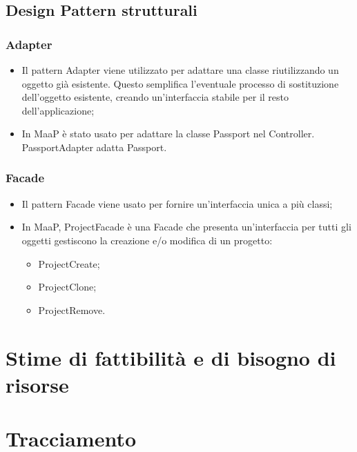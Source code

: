 \subsection{Design Pattern strutturali}
\subsubsection{Adapter}
\begin{itemize}
\item {} Il pattern Adapter viene utilizzato per adattare una classe riutilizzando un oggetto già esistente. Questo semplifica l'eventuale processo di sostituzione dell'oggetto esistente, creando un'interfaccia stabile per il resto dell'applicazione; 
\item {} In MaaP è stato usato per adattare la classe Passport nel Controller. PassportAdapter adatta Passport.
\end{itemize}

\subsubsection{Facade}
\begin{itemize}
\item {} Il pattern Facade viene usato per fornire un'interfaccia unica a più classi; 
\item {} In MaaP, ProjectFacade è una Facade che presenta un'interfaccia per tutti gli oggetti gestiscono la creazione e/o modifica di un progetto:\\
\begin{itemize}
\item ProjectCreate;
\item ProjectClone;
\item ProjectRemove.
\end{itemize}
\end{itemize}

\newpage
\section{Stime di fattibilità e di bisogno di risorse}

\newpage
\section{Tracciamento} 
